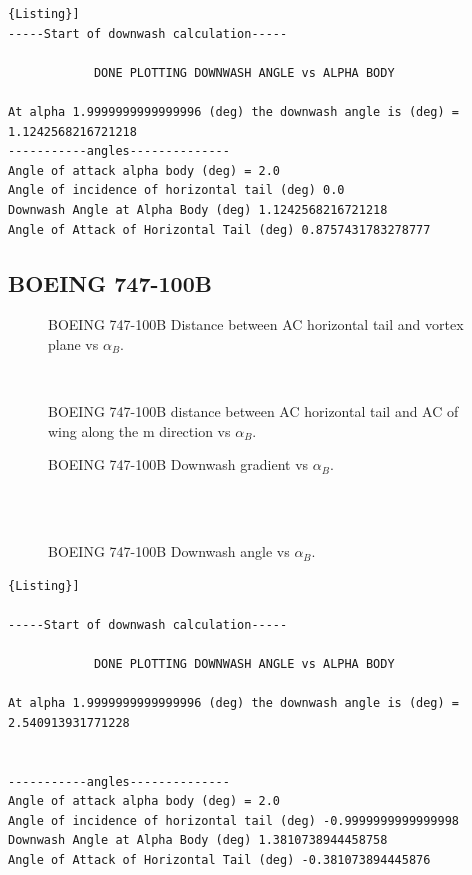 \begin{lstlisting}[caption={{\footnotesize Downwash estimation - Results. ATR 72}},label= [style=\bfseries]{Listing}]
-----Start of downwash calculation-----

			DONE PLOTTING DOWNWASH ANGLE vs ALPHA BODY

At alpha 1.9999999999999996 (deg) the downwash angle is (deg) = 1.1242568216721218
-----------angles-------------- 
Angle of attack alpha body (deg) = 2.0
Angle of incidence of horizontal tail (deg) 0.0
Downwash Angle at Alpha Body (deg) 1.1242568216721218
Angle of Attack of Horizontal Tail (deg) 0.8757431783278777
\end{lstlisting}

\subsection{BOEING 747-100B}
\begin{figure}[H]
\centering

\caption{BOEING 747-100B Distance between AC horizontal tail and vortex plane vs $\alpha_{B}$.}
\label{fig:zATR}
\end{figure}
\noindent \\
\begin{figure}[H]
\centering

\caption{BOEING 747-100B distance between AC horizontal tail and AC of wing along the m direction vs $\alpha_{B}$.}
\label{fig:zboeing}
\end{figure}


\begin{figure}[H]
\centering

\caption{BOEING 747-100B  Downwash gradient vs $\alpha_{B}$.}
\label{fig:downwashgradboeing}
\end{figure}
\noindent \\ \\ 
\begin{figure}[H]
\centering

\caption{BOEING 747-100B Downwash angle vs $\alpha_{B}$.}
\label{fig:epsilonboeing}
\end{figure}





\newpage

\begin{lstlisting}[caption={{\footnotesize Downwash estimation - Results. BOEING 747-100B}},label= [style=\bfseries]{Listing}]

-----Start of downwash calculation-----

			DONE PLOTTING DOWNWASH ANGLE vs ALPHA BODY

At alpha 1.9999999999999996 (deg) the downwash angle is (deg) = 2.540913931771228

 
-----------angles-------------- 
Angle of attack alpha body (deg) = 2.0
Angle of incidence of horizontal tail (deg) -0.9999999999999998
Downwash Angle at Alpha Body (deg) 1.3810738944458758
Angle of Attack of Horizontal Tail (deg) -0.381073894445876
\end{lstlisting}

